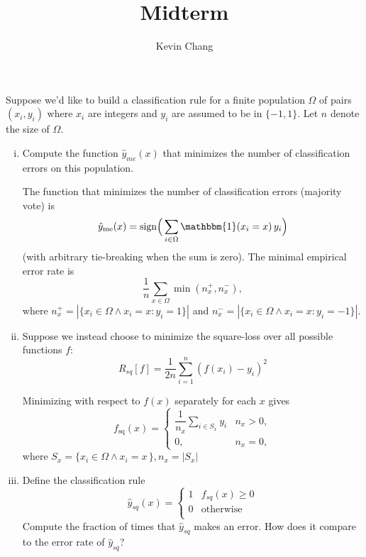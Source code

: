 \documentclass[a4paper]{article}
\title{Midterm}
\author{Kevin Chang}
\begin{document}
\maketitle

\section{}
Suppose we’d like to build a classification rule for a finite population $\Omega$ of pairs $(x_i , y_i)$ where $x_i$ are integers and $y_i$ are assumed to be in $\{-1, 1\}$.
Let $n$ denote the size of $\Omega$.
\begin{enumerate}[(i)]
    \item Compute the function $\hat{y}_\mathit{me}(x)$ that minimizes the number of classification errors on this population.

The function that minimizes the number of classification errors (majority vote) is
$$\hat{y}_{\mathrm{me}}(x) = \operatorname{sign}\!\Big(\sum_{i \in \Omega} \mathbbm{1}(x_i = x)\, y_i \Big)$$
(with arbitrary tie-breaking when the sum is zero).  
The minimal empirical error rate is
$$\frac{1}{n} \sum_{x \in \Omega} \min(n_x^+, n_x^-),$$
where $n_x^+ = |\{ x_i \in \Omega \wedge x_i = x : y_i = 1 \}|$ and $n_x^- = |\{ x_i \in \Omega \wedge x_i = x : y_i = -1 \}|$.

    \item Suppose we instead choose to minimize the square-loss over all possible functions $f$:
        $$R_\mathit{sq}[f]=\frac{1}{2n}\sum_{i=1}^n (f(x_i)-y_i)^2$$

        Minimizing with respect to $f(x)$ separately for each $x$ gives
        $$f_{\mathrm{sq}}(x) =
        \begin{cases}
        \dfrac{1}{n_x}\displaystyle\sum_{i \in S_x} y_i & n_x > 0, \\[8pt]
        0, & n_x = 0,
        \end{cases}$$
        where $S_x = \{x_i \in \Omega \wedge x_i = x \,\}, n_x = |S_x|$

    \item Define the classification rule
        $$\hat{y}_\mathit{sq}(x)=\left\{ \begin{array}{ll}
                1 & f_\mathit{sq}(x)\geq 0 \\
                0 & \text{otherwise} \\
        \end{array}\right.$$
Compute the fraction of times that $\hat{y}_\mathit{sq}$ makes an error.
How does it compare to the error rate of $\hat{y}_\mathit{sq}$?


\end{enumerate}
\end{document}
